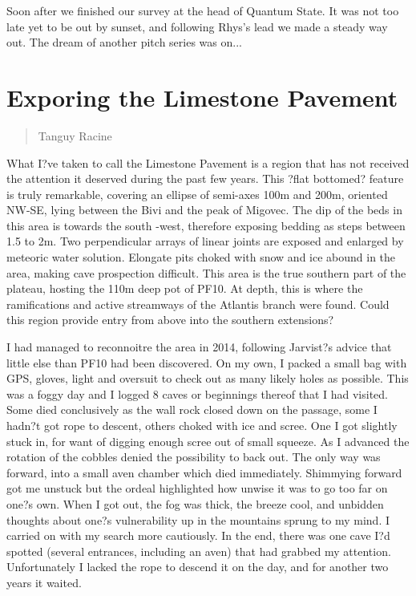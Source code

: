 \documentclass[onecolumn]{book}
\begin{document}
Soon after we finished our survey at the head of Quantum State. It was not too late yet to be out by sunset, and following Rhys's lead we made a steady way out. The dream of another pitch series was on...

\section{Exporing the Limestone Pavement} 
 \begin{verse}
Tanguy Racine
\end{verse}
What I?ve taken to call the Limestone Pavement is a region that has not received the attention it deserved during the past few years. This ?flat bottomed? feature is truly remarkable, covering an ellipse of semi-axes 100m and 200m, oriented NW-SE, lying between the Bivi and the peak of Migovec. The dip of the beds in this area is towards the south -west, therefore exposing bedding as steps between 1.5 to 2m. Two perpendicular arrays of linear joints are exposed and enlarged by meteoric water solution. Elongate pits choked with snow and ice abound in the area, making cave prospection difficult. This area is the true southern part of the plateau, hosting the 110m deep pot of PF10.  At depth, this is where the ramifications and active streamways of the Atlantis branch were found. Could this region provide entry from above into the southern extensions?

I had managed to reconnoitre the area in 2014, following Jarvist?s advice that little else than PF10 had been discovered. On my own, I packed a small bag with GPS, gloves, light and oversuit to check out as many likely holes as possible. This was a foggy day and I logged 8 caves or beginnings thereof that I had visited. Some died conclusively as the wall rock closed down on the passage, some I hadn?t got rope to descent, others choked with ice and scree. One I got slightly stuck in, for want of digging enough scree out of small squeeze. As I advanced the rotation of the cobbles denied the possibility to back out. The only way was forward, into a small aven chamber which died immediately. Shimmying forward got me unstuck but the ordeal highlighted how unwise it was to go too far on one?s own. When I got out, the fog was thick, the breeze cool, and unbidden thoughts about one?s vulnerability up in the mountains sprung to my mind. I carried on with my search more cautiously. In the end, there was one cave I?d spotted (several entrances, including an aven) that had grabbed my attention. Unfortunately I lacked the rope to descend it on the day, and for another two years it waited.
\end{document}
